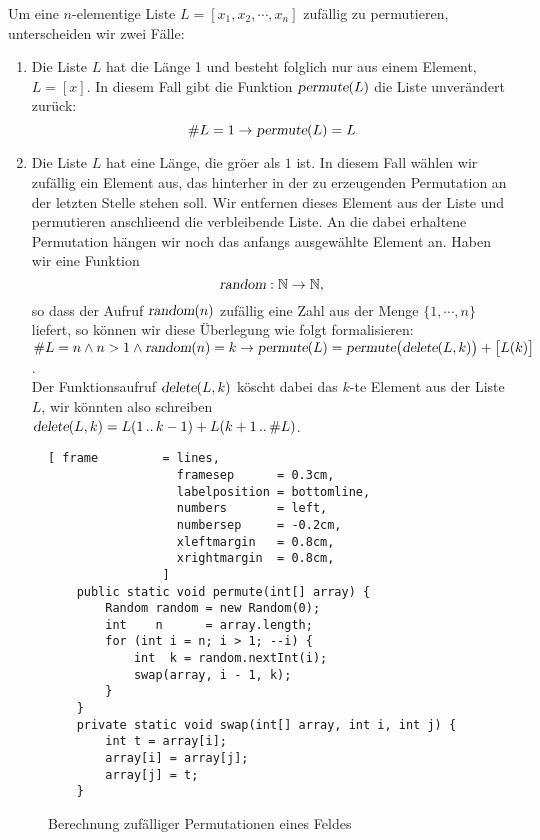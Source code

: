 Um eine $n$-elementige Liste $L = [x_1,x_2, \cdots, x_n]$ zuf\"allig zu permutieren,
unterscheiden wir zwei F\"alle:
\begin{enumerate}
\item Die Liste $L$ hat die L\"ange 1 und besteht folglich nur aus einem Element, $L = [x]$.
      In diesem Fall gibt die Funktion $\textsl{permute}(L)$ die Liste unver\"andert zur\"uck:
      \[ \#L = 1 \rightarrow \textsl{permute}(L) = L \]
\item Die Liste $L$ hat eine L\"ange, die gr\"o\3er als $1$ ist.  In diesem Fall w\"ahlen wir
      zuf\"allig ein Element aus, das hinterher  in der zu erzeugenden Permutation an der letzten Stelle
      stehen soll.  Wir entfernen dieses Element aus der Liste und permutieren
      anschlie\3end die verbleibende Liste.  An die dabei erhaltene Permutation h\"angen wir
      noch das anfangs ausgew\"ahlte Element an.  Haben wir eine Funktion
      \[ \textsl{random}: \mathbb{N} \rightarrow \mathbb{N}, \]
      so dass der Aufruf $\textsl{random}(n)$ zuf\"allig eine Zahl aus der Menge $\{1,\cdots,n\}$
      liefert, so k\"onnen wir diese \"Uberlegung wie folgt formalisieren:
      \\[0.2cm]
      \hspace*{1.3cm}
      $ \#L = n \wedge n > 1 \wedge \textsl{random}(n) = k \rightarrow 
         \textsl{permute}(L) = \textsl{permute}\bigl(\textsl{delete}(L,k)\bigr) + \bigl[ L(k)
         \bigr]
      $.
\\[0.2cm]
      Der  Funktionsaufruf $\textsl{delete}(L,k)$ k\"oscht dabei das $k$-te Element aus der Liste $L$,
      wir k\"onnten also schreiben
      \\[0.2cm]
      \hspace*{1.3cm}
      $\textsl{delete}(L,k) = L(1\,..\,k-1) + L(k+1\,..\,\#L)$.
\end{enumerate}

\begin{figure}[!ht]
\centering
\begin{Verbatim}[ frame         = lines, 
                  framesep      = 0.3cm, 
                  labelposition = bottomline,
                  numbers       = left,
                  numbersep     = -0.2cm,
                  xleftmargin   = 0.8cm,
                  xrightmargin  = 0.8cm,
                ]
    public static void permute(int[] array) {
        Random random = new Random(0);
        int    n      = array.length;
        for (int i = n; i > 1; --i) {
            int  k = random.nextInt(i);
            swap(array, i - 1, k);
        }
    }
    private static void swap(int[] array, int i, int j) {
        int t = array[i];
        array[i] = array[j];
        array[j] = t;
    }
\end{Verbatim}
\vspace*{-0.3cm}
\caption{Berechnung zuf\"alliger Permutationen eines Feldes}
\label{fig:RandomPermutation.java}
\end{figure}

